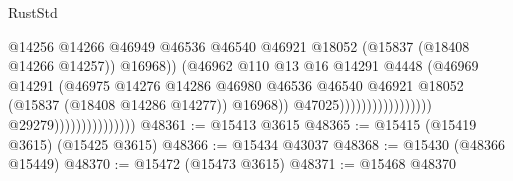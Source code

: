 \begin{lexlean}{RustStd}
\begin{coremodule}
                                                                      @14256
                                                                      @14266
                                                                      @46949
                                                                      @46536
                                                                      @46540
                                                                      @46921
                                                                      @18052
                                                                      (@15837
                                                                        (@18408 @14266 @14257))
                                                                      @16968))
                                                                  (@46962
                                                                    @110
                                                                    @13
                                                                    @16
                                                                    @14291
                                                                    @4448
                                                                    (@46969
                                                                      @14291
                                                                      (@46975
                                                                        @14276
                                                                        @14286
                                                                        @46980
                                                                        @46536
                                                                        @46540
                                                                        @46921
                                                                        @18052
                                                                        (@15837
                                                                          (@18408 @14286 @14277))
                                                                        @16968))
                                                                    @47025)))))))))))))))))
                                  @29279)))))))))))))))
@48361 := @15413 @3615
@48365 := @15415 (@15419 @3615) (@15425 @3615)
@48366 := @15434 @43037
@48368 := @15430 (@48366 @15449)
@48370 := @15472 (@15473 @3615)
@48371 := @15468 @48370

\end{coremodule}
\end{lexlean}
